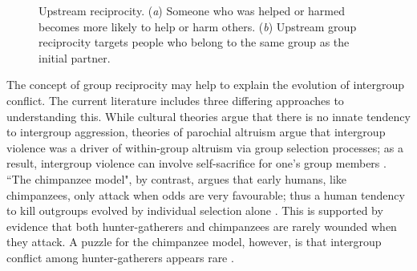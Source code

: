 \documentclass[12pt,a4paper]{article}\usepackage[]{graphicx}\usepackage[]{color}
\begin{document}
\begin{figure}
\begin{center}
\begin{subfigure}[b]{0.4\textwidth}
            \caption{}\label{group}
        \end{subfigure}
        \caption{Upstream reciprocity. (\textit{a}) Someone who was helped or harmed becomes more likely to help or harm others. (\textit{b})
    Upstream group reciprocity targets people who belong to
    the same group as the initial partner.}
        \label{fig:illustration}
	\end{center}
\end{figure}

The concept of group reciprocity may help to explain the evolution of intergroup conflict. The current literature 
includes three differing approaches to understanding this. While cultural theories argue that there is no innate tendency to 
intergroup aggression, theories of parochial altruism argue that intergroup violence was a driver of within-group 
altruism via group selection processes; as a result, intergroup violence can involve self-sacrifice for one's group
members \citep{choi2007coevolution,bowles2009did}. ``The chimpanzee model", by contrast, argues that early humans, like
chimpanzees, only attack when odds are very favourable; thus a human tendency to kill outgroups evolved by individual
selection alone \citep{wrangham2012intergroup}. This is supported by evidence that both 
hunter-gatherers and chimpanzees are rarely wounded when they attack. A puzzle for the chimpanzee model, however, is 
that intergroup conflict among hunter-gatherers appears rare \citep{fry2013lethal}. 
\end{document}
